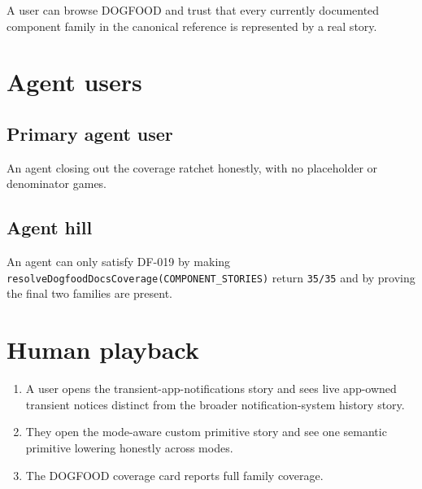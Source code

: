 A user can browse DOGFOOD and trust that every currently documented component family in the canonical reference is represented by a real story.

\section{Agent users}\label{record-081-agent-users}

\subsection{Primary agent user}\label{record-081-primary-agent-user}

An agent closing out the coverage ratchet honestly, with no placeholder or denominator games.

\subsection{Agent hill}\label{record-081-agent-hill}

An agent can only satisfy DF-019 by making \texttt{r\allowbreak{}e\allowbreak{}s\allowbreak{}o\allowbreak{}l\allowbreak{}v\allowbreak{}e\allowbreak{}D\allowbreak{}o\allowbreak{}g\allowbreak{}f\allowbreak{}o\allowbreak{}o\allowbreak{}d\allowbreak{}D\allowbreak{}o\allowbreak{}c\allowbreak{}s\allowbreak{}C\allowbreak{}o\allowbreak{}v\allowbreak{}e\allowbreak{}r\allowbreak{}a\allowbreak{}g\allowbreak{}e\allowbreak{}(\allowbreak{}C\allowbreak{}O\allowbreak{}M\allowbreak{}P\allowbreak{}O\allowbreak{}N\allowbreak{}E\allowbreak{}N\allowbreak{}T\allowbreak{}\_\allowbreak{}S\allowbreak{}T\allowbreak{}O\allowbreak{}R\allowbreak{}I\allowbreak{}E\allowbreak{}S\allowbreak{})} return \texttt{3\allowbreak{}5\allowbreak{}/\allowbreak{}3\allowbreak{}5} and by proving the final two families are present.

\section{Human playback}\label{record-081-human-playback}

\begin{enumerate}
\def\labelenumi{\arabic{enumi}.}
\tightlist
\item
  A user opens the transient-app-notifications story and sees live app-owned transient notices distinct from the broader notification-system history story.
\item
  They open the mode-aware custom primitive story and see one semantic primitive lowering honestly across modes.
\item
  The DOGFOOD coverage card reports full family coverage.
\end{enumerate}


